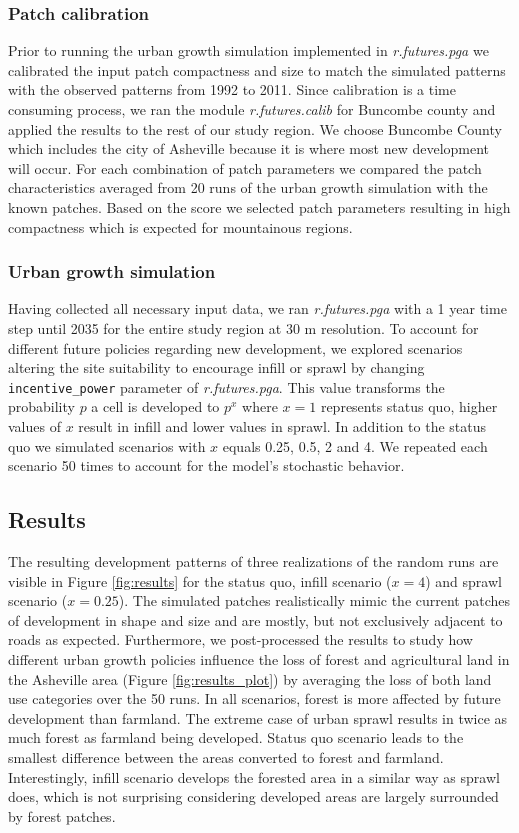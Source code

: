\documentclass{isprs}
\begin{document}
\subsubsection{Patch calibration}
Prior to running the urban growth simulation implemented in \emph{r.futures.pga}
we calibrated the input patch compactness and size to match
the simulated patterns with the observed patterns from 1992 to 2011.
Since calibration is a time consuming process, we ran the module
\emph{r.futures.calib} for Buncombe county 
and applied the results to the rest of our study region.
We choose Buncombe County which includes the city of Asheville  because it is where most new development will occur.
For each combination of patch parameters we compared the patch characteristics 
averaged from 20 runs of the urban growth simulation with the known patches.
Based on the score we selected patch parameters resulting in high compactness
which is expected for mountainous regions.


\subsubsection{Urban growth simulation}
Having collected all necessary input data, we ran 
\emph{r.futures.pga} with a 1 year time step until 2035 for the entire study region at 30 m resolution.
To account for different future policies regarding new development, we explored
scenarios altering the site suitability to encourage infill or sprawl by changing
\texttt{incentive\_power} parameter of \emph{r.futures.pga}. This value transforms
the probability $p$ a cell is developed to $p^x$ where $x = 1$ represents status quo,
higher values of $x$ result in infill and lower values in sprawl.
In addition to the status quo we simulated scenarios with $x$ equals 0.25, 0.5, 2 and 4.
We repeated each scenario 50 times to account for the model's stochastic behavior.



\subsection{Results}
The resulting development patterns of three realizations of the random runs
are visible in Figure \ref{fig:results}
for the status quo, infill scenario ($x = 4$) and sprawl scenario ($x=0.25$).
The simulated patches realistically mimic the current patches of development in shape and size
and are mostly, but not exclusively adjacent to roads as expected.
Furthermore, we post-processed the results to study how different urban growth policies
influence the loss of forest and agricultural land in the Asheville area
(Figure \ref{fig:results_plot})
by averaging the loss of both land use categories over the 50 runs.
In all scenarios, forest is more affected by future development than farmland.
The extreme case of urban sprawl results in twice as much forest as farmland being developed.
Status quo scenario leads to the smallest difference between the areas converted to forest and farmland.
Interestingly, infill scenario develops the forested area in a similar way as sprawl does, which 
is not surprising considering developed areas are largely surrounded by forest patches.
\end{document}
